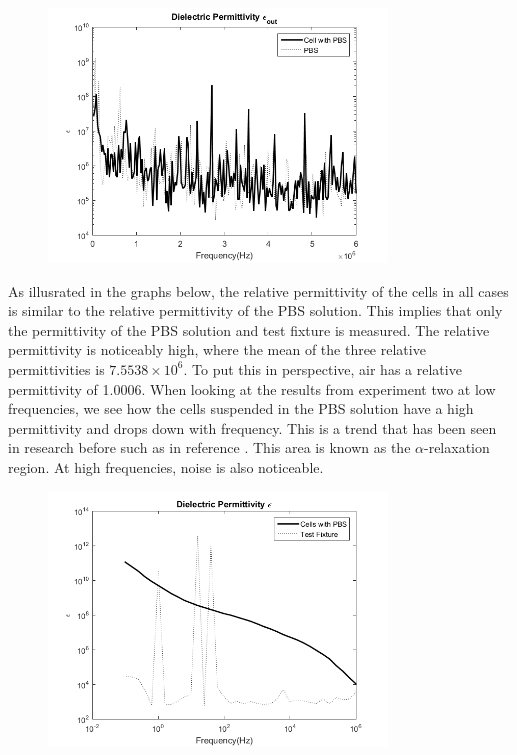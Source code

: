 \documentclass[journal]{IEEEtran}
\begin{document}
\begin{figure}[ht]
\label{diectric_Permittivity_Out}
\includegraphics[width = 9cm]{Epsilon_Out.png}
\end{figure}

As illusrated in the graphs below, the relative permittivity of the cells in all cases is similar to the relative permittivity of the PBS solution. This implies that only the permittivity of the PBS solution and test fixture is measured. The relative permittivity is noticeably high, where the mean of the three relative permittivities is $7.5538\times10^6$. To put this in perspective, air has a relative permittivity of 1.0006. When looking at the results from experiment two at low frequencies, we see how the cells suspended in the PBS solution have a high permittivity and drops down with frequency. This is a trend that has been seen in research before such as in reference \cite{Dielectric Spectroscopy}. This area is known as the $\alpha$-relaxation region. At high frequencies, noise is also noticeable. 

\begin{figure}[ht]
\label{diectric_Permittivity_Low_Freq}
\includegraphics[width = 9cm]{Epsilon_Low_Freq.png}
\end{figure}
\end{document}
